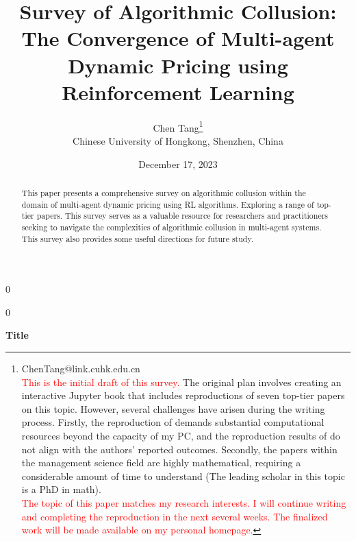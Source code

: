 \documentclass[12pt]{article}
\newcommand{\blind}{0}
\begin{document}
%

\def\spacingset#1{\renewcommand{\baselinestretch}%
  {#1}\small\normalsize} \spacingset{1}



\blind
  {
    \title{\bf Survey of Algorithmic Collusion: The Convergence of Multi-agent Dynamic Pricing using Reinforcement Learning}
    \author{Chen Tang\thanks{
        ChenTang@link.cuhk.edu.cn\\
        \textcolor{red}{This is the initial draft of this survey.} The original plan involves creating an interactive Jupyter book that includes reproductions of seven top-tier papers on this topic. However, several challenges have arisen during the writing process. Firstly, the reproduction of \cite{calvano2020artificial} demands substantial computational resources beyond the capacity of my PC, and the reproduction results of \cite{hansen2021frontiers} do not align with the authors' reported outcomes. Secondly, the papers within the management science field are highly mathematical, requiring a considerable amount of time to understand (The leading scholar in this topic is a PhD in math).\\
        \textcolor{red}{The topic of this paper matches my research interests. I will continue writing and completing the reproduction in the next several weeks. The finalized work will be made available on my personal homepage.}}\hspace{.2cm}\\
       Chinese University of Hongkong, Shenzhen, China}
    \date{December 17, 2023}
    \maketitle
  } \fi

\blind
  {
    \bigskip
    \bigskip
    \bigskip
    \begin{center}
      {\LARGE\bf Title}
    \end{center}
    \medskip
  } \fi

\bigskip
\begin{abstract}
    This paper presents a comprehensive survey on algorithmic collusion within the domain of multi-agent dynamic pricing using RL algorithms. Exploring a range of top-tier papers. This survey serves as a valuable resource for researchers and practitioners seeking to navigate the complexities of algorithmic collusion in multi-agent systems. This survey also provides some useful directions for future study. 
\end{abstract}
\end{document}
